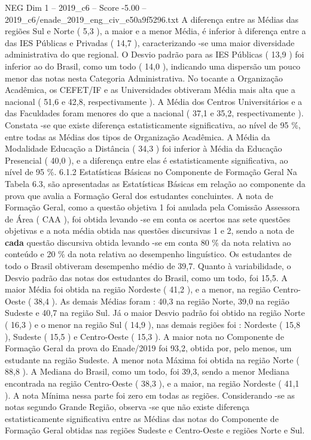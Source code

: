 \begin{textsample}{NEG Dim 1 – 2019\_c6 – Score -5.00 – 2019\_c6/enade\_2019\_eng\_civ\_e50a9f5296.txt}
A diferença entre as Médias das regiões Sul e Norte ( 5,3 ), a maior e a menor Média, é inferior à diferença entre a das IES Públicas e Privadas ( 14,7 ), caracterizando -se uma maior diversidade administrativa do que regional.
O Desvio padrão para as IES Públicas ( 13,9 ) foi inferior ao do Brasil, como um todo ( 14,0 ), indicando uma dispersão um pouco menor das notas nesta Categoria Administrativa.
No tocante a Organização Acadêmica, os CEFET/IF e as Universidades obtiveram Média mais alta que a nacional ( 51,6 e 42,8, respectivamente ).
A Média dos Centros Universitários e a das Faculdades foram menores do que a nacional ( 37,1 e 35,2, respectivamente ).
Constata -se que existe diferença estatisticamente significativa, ao nível de 95 \%, entre todas as Médias dos tipos de Organização Acadêmica.
A Média da Modalidade Educação a Distância ( 34,3 ) foi inferior à Média da Educação Presencial ( 40,0 ), e a diferença entre elas é estatisticamente significativa, ao nível de 95 \%. 6.1.2 Estatísticas Básicas no Componente de Formação Geral Na Tabela 6.3, são apresentadas as Estatísticas Básicas em relação ao componente da prova que avalia a Formação Geral dos estudantes concluintes.
A nota de Formação Geral, como a questão objetiva 1 foi anulada pela Comissão Assessora de Área ( CAA ), foi obtida levando -se em conta os acertos nas sete questões objetivas e a nota média obtida nas questões discursivas 1 e 2, sendo a nota de \textbf{cada} questão discursiva obtida levando -se em conta 80 \% da nota relativa ao conteúdo e 20 \% da nota relativa ao desempenho linguístico.
Os estudantes de todo o Brasil obtiveram desempenho médio de 39,7.
Quanto à variabilidade, o Desvio padrão das notas dos estudantes do Brasil, como um todo, foi 15,5.
A maior Média foi obtida na região Nordeste ( 41,2 ), e a menor, na região Centro-Oeste ( 38,4 ).
As demais Médias foram : 40,3 na região Norte, 39,0 na região Sudeste e 40,7 na região Sul.
Já o maior Desvio padrão foi obtido na região Norte ( 16,3 ) e o menor na região Sul ( 14,9 ), nas demais regiões foi : Nordeste ( 15,8 ), Sudeste ( 15,5 ) e Centro-Oeste ( 15,3 ).
A maior nota no Componente de Formação Geral da prova do Enade/2019 foi 93,2, obtida por, pelo menos, um estudante na região Sudeste.
A menor nota Máxima foi obtida na região Norte ( 88,8 ).
A Mediana do Brasil, como um todo, foi 39,3, sendo a menor Mediana encontrada na região Centro-Oeste ( 38,3 ), e a maior, na região Nordeste ( 41,1 ).
A nota Mínima nessa parte foi zero em todas as regiões.
Considerando -se as notas segundo Grande Região, observa -se que não existe diferença estatisticamente significativa entre as Médias das notas do Componente de Formação Geral obtidas nas regiões Sudeste e Centro-Oeste e regiões Norte e Sul.

\end{textsample}
